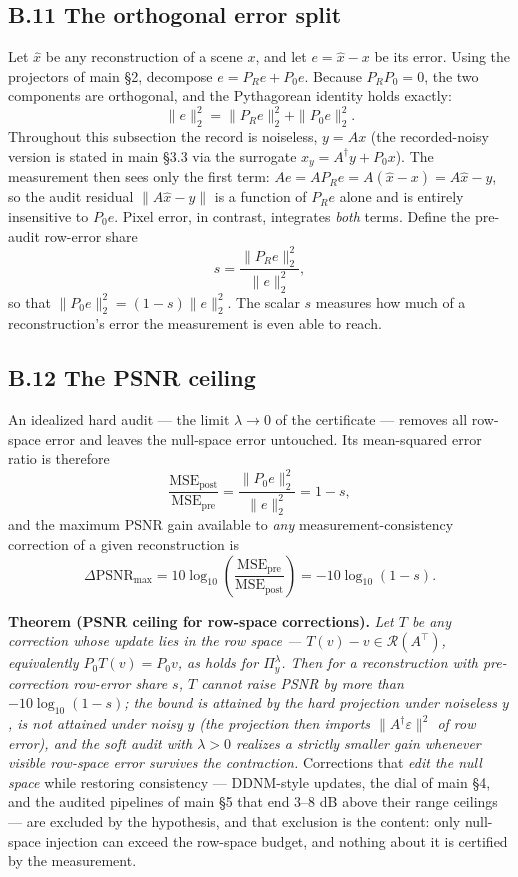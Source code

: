 \documentclass[11pt]{article}
\begin{document}
\subsection*{B.11 The orthogonal error split}

Let $\hat{x}$ be any reconstruction of a scene $x$, and let $e = \hat{x} - x$ be its error. Using the projectors of main §2, decompose $e = P_R e + P_0 e$. Because $P_R P_0 = 0$, the two components are orthogonal, and the Pythagorean identity holds exactly:
$$\|e\|_2^2 = \|P_R e\|_2^2 + \|P_0 e\|_2^2.$$
Throughout this subsection the record is noiseless, $y = Ax$ (the recorded-noisy version is stated in main §3.3 via the surrogate $x_y = A^\dagger y + P_0 x$). The measurement then sees only the first term: $A e = A P_R e = A(\hat{x} - x) = A\hat{x} - y$, so the audit residual $\|A\hat{x}-y\|$ is a function of $P_R e$ alone and is entirely insensitive to $P_0 e$. Pixel error, in contrast, integrates \textit{both} terms. Define the pre-audit row-error share
$$s = \frac{\|P_R e\|_2^2}{\|e\|_2^2},$$
so that $\|P_0 e\|_2^2 = (1-s)\|e\|_2^2$. The scalar $s$ measures how much of a reconstruction's error the measurement is even able to reach.

\subsection*{B.12 The PSNR ceiling}

An idealized hard audit --- the limit $\lambda \to 0$ of the certificate --- removes all row-space error and leaves the null-space error untouched. Its mean-squared error ratio is therefore
$$\frac{\mathrm{MSE}_{\mathrm{post}}}{\mathrm{MSE}_{\mathrm{pre}}} = \frac{\|P_0 e\|_2^2}{\|e\|_2^2} = 1 - s,$$
and the maximum PSNR gain available to \textit{any} measurement-consistency correction of a given reconstruction is
$$\Delta\mathrm{PSNR}_{\max} = 10\log_{10}\!\left(\frac{\mathrm{MSE}_{\mathrm{pre}}}{\mathrm{MSE}_{\mathrm{post}}}\right) = -10\log_{10}(1 - s).$$

\textbf{Theorem (PSNR ceiling for row-space corrections).} \textit{Let $T$ be any correction whose update lies in the row space --- $T(v) - v \in \mathcal{R}(A^\top)$, equivalently $P_0 T(v) = P_0 v$, as holds for $\Pi_y^\lambda$. Then for a reconstruction with pre-correction row-error share $s$, $T$ cannot raise PSNR by more than $-10\log_{10}(1-s)$; the bound is attained by the hard projection under noiseless $y$, is not attained under noisy $y$ (the projection then imports $\|A^\dagger\varepsilon\|^2$ of row error), and the soft audit with $\lambda>0$ realizes a strictly smaller gain whenever visible row-space error survives the contraction.} Corrections that \textit{edit the null space} while restoring consistency --- DDNM-style updates, the dial of main §4, and the audited pipelines of main §5 that end $3$--$8$ dB above their range ceilings --- are excluded by the hypothesis, and that exclusion is the content: only null-space injection can exceed the row-space budget, and nothing about it is certified by the measurement.
\end{document}

